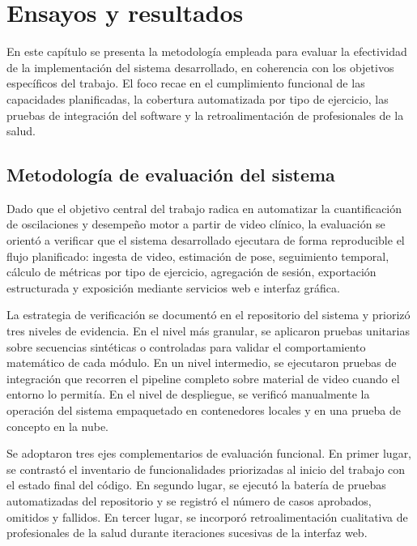 
\chapter{Ensayos y resultados}

\label{Chapter4}

En este capítulo se presenta la metodología empleada para evaluar la efectividad de la implementación del sistema desarrollado, en coherencia con los objetivos específicos del trabajo. El foco recae en el cumplimiento funcional de las capacidades planificadas, la cobertura automatizada por tipo de ejercicio, las pruebas de integración del software y la retroalimentación de profesionales de la salud.


\section{Metodología de evaluación del sistema}
\label{sec:metodologia-evaluacion}

Dado que el objetivo central del trabajo radica en automatizar la cuantificación de oscilaciones y desempeño motor a partir de video clínico, la evaluación se orientó a verificar que el sistema desarrollado ejecutara de forma reproducible el flujo planificado: ingesta de video, estimación de pose, seguimiento temporal, cálculo de métricas por tipo de ejercicio, agregación de sesión, exportación estructurada y exposición mediante servicios web e interfaz gráfica.

La estrategia de verificación se documentó en el repositorio del sistema y priorizó tres niveles de evidencia. En el nivel más granular, se aplicaron pruebas unitarias sobre secuencias sintéticas o controladas para validar el comportamiento matemático de cada módulo. En un nivel intermedio, se ejecutaron pruebas de integración que recorren el pipeline completo sobre material de video cuando el entorno lo permitía. En el nivel de despliegue, se verificó manualmente la operación del sistema empaquetado en contenedores locales y en una prueba de concepto en la nube.

Se adoptaron tres ejes complementarios de evaluación funcional. En primer lugar, se contrastó el inventario de funcionalidades priorizadas al inicio del trabajo con el estado final del código. En segundo lugar, se ejecutó la batería de pruebas automatizadas del repositorio y se registró el número de casos aprobados, omitidos y fallidos. En tercer lugar, se incorporó retroalimentación cualitativa de profesionales de la salud durante iteraciones sucesivas de la interfaz web.

